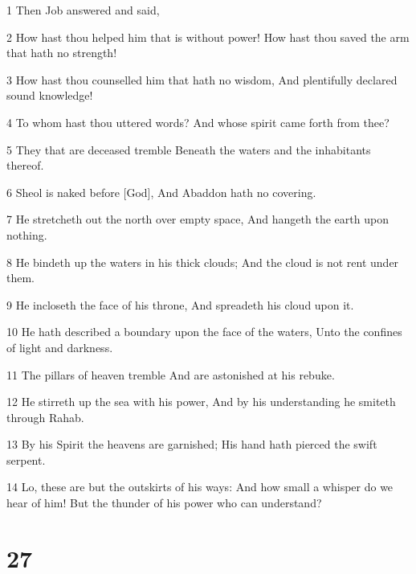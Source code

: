 \par 1 Then Job answered and said,
\par 2 How hast thou helped him that is without power! How hast thou saved the arm that hath no strength!
\par 3 How hast thou counselled him that hath no wisdom, And plentifully declared sound knowledge!
\par 4 To whom hast thou uttered words? And whose spirit came forth from thee?
\par 5 They that are deceased tremble Beneath the waters and the inhabitants thereof.
\par 6 Sheol is naked before [God], And Abaddon hath no covering.
\par 7 He stretcheth out the north over empty space, And hangeth the earth upon nothing.
\par 8 He bindeth up the waters in his thick clouds; And the cloud is not rent under them.
\par 9 He incloseth the face of his throne, And spreadeth his cloud upon it.
\par 10 He hath described a boundary upon the face of the waters, Unto the confines of light and darkness.
\par 11 The pillars of heaven tremble And are astonished at his rebuke.
\par 12 He stirreth up the sea with his power, And by his understanding he smiteth through Rahab.
\par 13 By his Spirit the heavens are garnished; His hand hath pierced the swift serpent.
\par 14 Lo, these are but the outskirts of his ways: And how small a whisper do we hear of him! But the thunder of his power who can understand?

\chapter{27}

